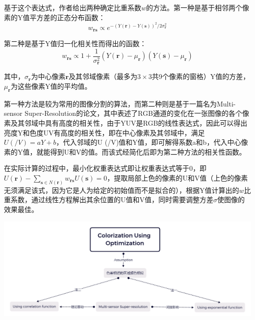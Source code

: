 \documentclass[12pt, a4paper, oneside]{report}
\begin{document}
	基于这个表达式，作者给出两种确定比重系数$w$的方法。第一种是基于相邻两个像素的Y值平方差的正态分布函数：
	$$w_{\mathbf{rs}}\propto e^{-\left(Y\left(\mathbf{r}\right) - Y\left(\mathbf{s}\right)\right)^2 / 2\sigma_{\mathbf{r}}^2}$$
	
	第二种是基于Y值归一化相关性而得出的函数：
	$$w_{\mathbf{rs}}\propto 1 + \frac{1}{\sigma_{\mathbf{r}}^2}\left(Y\left(\mathbf{r}\right) - \mu_{\mathbf{r}}\right)\left(Y\left(\mathbf{s}\right) - \mu_{\mathbf{r}}\right)$$
	
	其中，$\sigma_{\mathbf{r}}$为中心像素$\mathbf{r}$及其邻域像素（最多为$3\times3$共9个像素的窗格）Y值的方差，$\mu_{\mathbf{r}}$为这些像素Y值的平均值。
	
	第一种方法是较为常用的图像分割的算法，而第二种则是基于一篇名为Multi-sensor Super-Resolution的论文，其中表述了RGB通道的变化在一张图像的各个像素及其邻域中具有高度的相关性，由于YUV是RGB的线性表达式，因此可以得出亮度Y和色度UV有高度的相关性，即在中心像素及其邻域中，满足$U\left(/V\right) = aY + b$，代入邻域的U (/V)值和Y值，即可解得系数a和b，代入中心像素的Y值，就能得到U和V的值。而该式经简化后即为第二种方法的相关性函数。
	
	在实际计算的过程中，最小化权重表达式即让权重表达式等于0，即$U\left(\mathbf{r}\right) - \sum_{\mathbf{s}\in
			N\left(\mathbf{r}\right)}w_{\mathbf{rs}}U\left(\mathbf{s}\right) = 0$，提取局部上色的像素的U和V值（上色的像素无须满足该式，因为它是人为给定的初始值而不是拟合的），根据Y值计算出的$w$比重系数，通过线性方程解出其余位置的U值和V值，同时需要调整方差$\sigma$使图像的效果最佳。
		
	\centerline{
	\includegraphics[scale=0.25]{Colorization Using Optimization.png}	
	}
	
\end{document}
